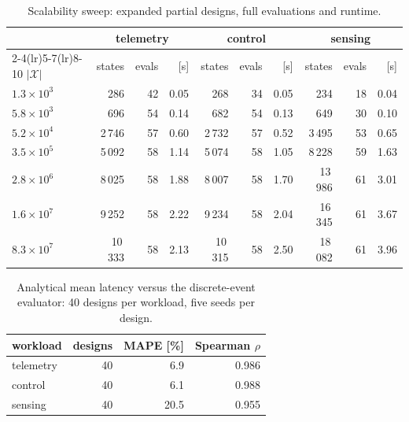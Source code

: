 \documentclass[pdflatex,sn-nature]{sn-jnl}
\theoremstyle{thmstyleone}
\theoremstyle{thmstyletwo}
\theoremstyle{thmstylethree}
\begin{document}
\begin{table}[!htbp]\centering
\caption{Scalability sweep: expanded partial designs, full evaluations and
runtime.}\label{tabS12}
{\let\scriptsize\tiny\setlength{\tabcolsep}{2pt}\scriptsize
\setlength{\tabcolsep}{3.5pt}
\begin{tabular}{lrrrrrrrrr}
\toprule
& \multicolumn{3}{c}{telemetry} & \multicolumn{3}{c}{control} & \multicolumn{3}{c}{sensing} \\
\cmidrule(lr){2-4}\cmidrule(lr){5-7}\cmidrule(lr){8-10}
$|\mathcal{X}|$ & states & evals & [s] & states & evals & [s] & states & evals & [s] \\
\midrule
${1.3\times 10^{3}}$ & 286 & 42 & 0.05 & 268 & 34 & 0.05 & 234 & 18 & 0.04 \\
${5.8\times 10^{3}}$ & 696 & 54 & 0.14 & 682 & 54 & 0.13 & 649 & 30 & 0.10 \\
${5.2\times 10^{4}}$ & 2\,746 & 57 & 0.60 & 2\,732 & 57 & 0.52 & 3\,495 & 53 & 0.65 \\
${3.5\times 10^{5}}$ & 5\,092 & 58 & 1.14 & 5\,074 & 58 & 1.05 & 8\,228 & 59 & 1.63 \\
${2.8\times 10^{6}}$ & 8\,025 & 58 & 1.88 & 8\,007 & 58 & 1.70 & 13\,986 & 61 & 3.01 \\
${1.6\times 10^{7}}$ & 9\,252 & 58 & 2.22 & 9\,234 & 58 & 2.04 & 16\,345 & 61 & 3.67 \\
${8.3\times 10^{7}}$ & 10\,333 & 58 & 2.13 & 10\,315 & 58 & 2.50 & 18\,082 & 61 & 3.96 \\
\bottomrule
\end{tabular}}
\end{table}

\begin{table}[!htbp]\centering
\caption{Analytical mean latency versus the discrete-event evaluator: 40 designs per
workload, five seeds per design.}\label{tabS13}
{\let\scriptsize\tiny\setlength{\tabcolsep}{2pt}\scriptsize
\begin{tabular}{lrrr}
\toprule
workload & designs & MAPE [\%] & Spearman $\rho$ \\
\midrule
telemetry & 40 & 6.9 & 0.986 \\
control & 40 & 6.1 & 0.988 \\
sensing & 40 & 20.5 & 0.955 \\
\bottomrule
\end{tabular}}
\end{table}
\end{document}
